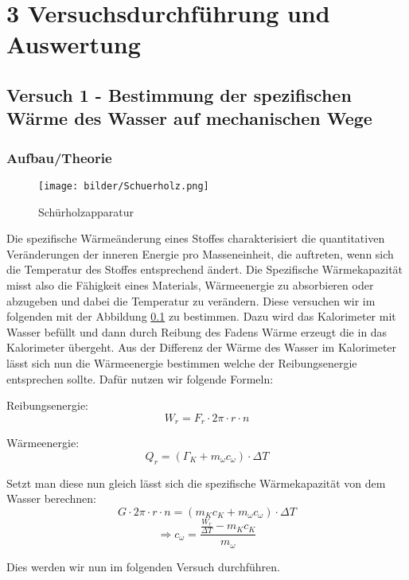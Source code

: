 \chapter*{3 Versuchsdurchführung und Auswertung}
\setcounter{chapter}{3}
\setcounter{section}{0}
\setcounter{subsection}{0}

\section{Versuch 1 - Bestimmung der spezifischen Wärme des Wasser auf mechanischen Wege}
	
	\subsection{Aufbau/Theorie}
	\begin{figure}[ht]
		\label{fig:abb1}
		   \begin{center}
		\texttt{[image: bilder/Schuerholz.png]}
		\caption{Schürholzapparatur}
	\end{center}
	\end{figure}
		Die spezifische Wärmeänderung eines Stoffes charakterisiert die quantitativen Veränderungen der inneren Energie pro Masseneinheit, die auftreten, wenn sich die Temperatur des Stoffes entsprechend ändert. Die Spezifische Wärmekapazität misst also die Fähigkeit eines Materials, Wärmeenergie zu absorbieren oder abzugeben und dabei die Temperatur zu verändern. Diese versuchen wir im folgenden mit der Abbildung \ref{fig:abb1} zu bestimmen. Dazu wird das Kalorimeter mit Wasser befüllt und dann durch Reibung des Fadens Wärme erzeugt die in das Kalorimeter übergeht. Aus der Differenz der Wärme des Wasser im Kalorimeter lässt sich nun die Wärmeenergie bestimmen welche der Reibungsenergie entsprechen sollte.
		Dafür nutzen wir folgende Formeln:
		
		Reibungsenergie:
		$$W_{r} = F_{r} \cdot 2\pi \cdot r \cdot n$$
		
		Wärmeenergie:
		$$Q_{r} =  (\Gamma_{K} + m_{\omega}c_{\omega}) \cdot \Delta T$$
		
		Setzt man diese nun gleich lässt sich die spezifische Wärmekapazität von dem Wasser berechnen:
		$$G \cdot 2\pi \cdot r \cdot n = (m_{K}c_{K} + m_{\omega}c_{\omega}) \cdot \Delta T$$
		$$ \Rightarrow c_{\omega} = \frac{\frac{W_{r}}{\Delta T} - m_{K}c_{K}}{m_{\omega}}$$		
		
		Dies werden wir nun im folgenden Versuch durchführen.
		

